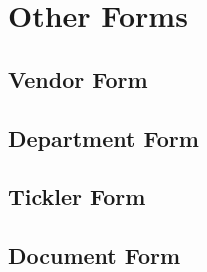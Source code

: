 \documentclass{report}
\begin{document}
\section{Other Forms}

\subsection{Vendor Form}

\subsection{Department Form}

\subsection{Tickler Form}

\subsection{Document Form}
\end{document}
